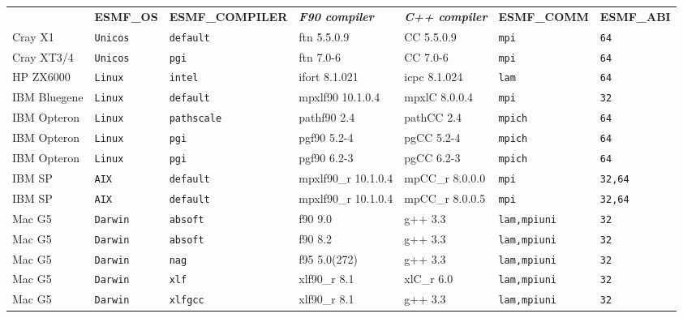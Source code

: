 \begin{tabular}{lllllll}
  &{\bfseries\footnotesize ESMF\_OS} &{\bfseries\footnotesize ESMF\_COMPILER} & {\bfseries\footnotesize\it F90 compiler} & {\bfseries\footnotesize\it C++ compiler} & {\bfseries\footnotesize ESMF\_COMM} & {\bfseries\footnotesize ESMF\_ABI} \\

Cray X1         &\tt Unicos &\tt default & ftn \footnotesize 5.5.0.9 & CC \footnotesize 5.5.0.9 &\tt mpi &\tt 64 \\
Cray XT3/4      &\tt Unicos &\tt pgi     & ftn \footnotesize 7.0-6   & CC \footnotesize 7.0-6   &\tt mpi &\tt 64 \\
HP ZX6000       &\tt Linux  &\tt intel   & ifort \footnotesize 8.1.021 & icpc \footnotesize 8.1.024 &\tt lam &\tt 64 \\
IBM Bluegene    &\tt Linux  &\tt default & mpxlf90 \footnotesize 10.1.0.4 & mpxlC \footnotesize 8.0.0.4 &\tt mpi &\tt 32 \\
IBM Opteron     &\tt Linux  &\tt pathscale & pathf90 \footnotesize 2.4 & pathCC \footnotesize 2.4 &\tt mpich &\tt 64 \\
IBM Opteron     &\tt Linux  &\tt pgi     & pgf90 \footnotesize 5.2-4 & pgCC \footnotesize 5.2-4 &\tt mpich   &\tt 64 \\
IBM Opteron     &\tt Linux  &\tt pgi     & pgf90 \footnotesize 6.2-3 & pgCC \footnotesize 6.2-3 &\tt mpich   &\tt 64 \\
IBM SP          &\tt AIX    &\tt default & mpxlf90\_r \footnotesize 10.1.0.4 & mpCC\_r \footnotesize 8.0.0.0 &\tt mpi &\tt 32,64 \\
IBM SP          &\tt AIX    &\tt default & mpxlf90\_r \footnotesize 10.1.0.4 & mpCC\_r \footnotesize 8.0.0.5 &\tt mpi &\tt 32,64 \\
Mac G5          &\tt Darwin &\tt absoft  & f90 \footnotesize 9.0     & g++ \footnotesize 3.3    &\tt lam,mpiuni &\tt 32 \\
Mac G5          &\tt Darwin &\tt absoft  & f90 \footnotesize 8.2     & g++ \footnotesize 3.3    &\tt lam,mpiuni &\tt 32 \\
Mac G5          &\tt Darwin &\tt nag     & f95 \footnotesize 5.0(272)& g++ \footnotesize 3.3    &\tt lam,mpiuni &\tt 32 \\
Mac G5          &\tt Darwin &\tt xlf     & xlf90\_r \footnotesize 8.1& xlC\_r \footnotesize 6.0 &\tt lam,mpiuni &\tt 32 \\
Mac G5          &\tt Darwin &\tt xlfgcc  & xlf90\_r \footnotesize 8.1& g++ \footnotesize 3.3    &\tt lam,mpiuni &\tt 32 \\

\end{tabular}
